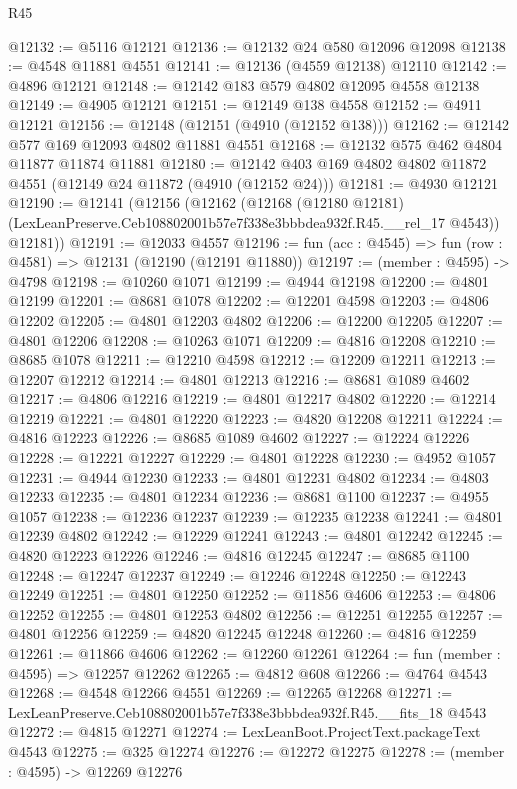 \begin{lexlean}{R45}
\begin{coremodule}
@12132 := @5116 @12121
@12136 := @12132 @24 @580 @12096 @12098
@12138 := @4548 @11881 @4551
@12141 := @12136 (@4559 @12138) @12110
@12142 := @4896 @12121
@12148 := @12142 @183 @579 @4802 @12095 @4558 @12138
@12149 := @4905 @12121
@12151 := @12149 @138 @4558
@12152 := @4911 @12121
@12156 := @12148 (@12151 (@4910 (@12152 @138)))
@12162 := @12142 @577 @169 @12093 @4802 @11881 @4551
@12168 := @12132 @575 @462 @4804 @11877 @11874 @11881
@12180 := @12142 @403 @169 @4802 @4802 @11872 @4551 (@12149 @24 @11872 (@4910 (@12152 @24)))
@12181 := @4930 @12121
@12190 := @12141
    (@12156
      (@12162
        (@12168
          (@12180 @12181)
          (LexLeanPreserve.Ceb108802001b57e7f338e3bbbdea932f.R45.__rel_17 @4543))
        @12181))
@12191 := @12033 @4557
@12196 := fun (acc : @4545) => fun (row : @4581) => @12131 (@12190 (@12191 @11880))
@12197 := (member : @4595) -> @4798
@12198 := @10260 @1071
@12199 := @4944 @12198
@12200 := @4801 @12199
@12201 := @8681 @1078
@12202 := @12201 @4598
@12203 := @4806 @12202
@12205 := @4801 @12203 @4802
@12206 := @12200 @12205
@12207 := @4801 @12206
@12208 := @10263 @1071
@12209 := @4816 @12208
@12210 := @8685 @1078
@12211 := @12210 @4598
@12212 := @12209 @12211
@12213 := @12207 @12212
@12214 := @4801 @12213
@12216 := @8681 @1089 @4602
@12217 := @4806 @12216
@12219 := @4801 @12217 @4802
@12220 := @12214 @12219
@12221 := @4801 @12220
@12223 := @4820 @12208 @12211
@12224 := @4816 @12223
@12226 := @8685 @1089 @4602
@12227 := @12224 @12226
@12228 := @12221 @12227
@12229 := @4801 @12228
@12230 := @4952 @1057
@12231 := @4944 @12230
@12233 := @4801 @12231 @4802
@12234 := @4803 @12233
@12235 := @4801 @12234
@12236 := @8681 @1100
@12237 := @4955 @1057
@12238 := @12236 @12237
@12239 := @12235 @12238
@12241 := @4801 @12239 @4802
@12242 := @12229 @12241
@12243 := @4801 @12242
@12245 := @4820 @12223 @12226
@12246 := @4816 @12245
@12247 := @8685 @1100
@12248 := @12247 @12237
@12249 := @12246 @12248
@12250 := @12243 @12249
@12251 := @4801 @12250
@12252 := @11856 @4606
@12253 := @4806 @12252
@12255 := @4801 @12253 @4802
@12256 := @12251 @12255
@12257 := @4801 @12256
@12259 := @4820 @12245 @12248
@12260 := @4816 @12259
@12261 := @11866 @4606
@12262 := @12260 @12261
@12264 := fun (member : @4595) => @12257 @12262
@12265 := @4812 @608
@12266 := @4764 @4543
@12268 := @4548 @12266 @4551
@12269 := @12265 @12268
@12271 := LexLeanPreserve.Ceb108802001b57e7f338e3bbbdea932f.R45.__fits_18 @4543
@12272 := @4815 @12271
@12274 := LexLeanBoot.ProjectText.packageText @4543
@12275 := @325 @12274
@12276 := @12272 @12275
@12278 := (member : @4595) -> @12269 @12276

\end{coremodule}
\end{lexlean}
